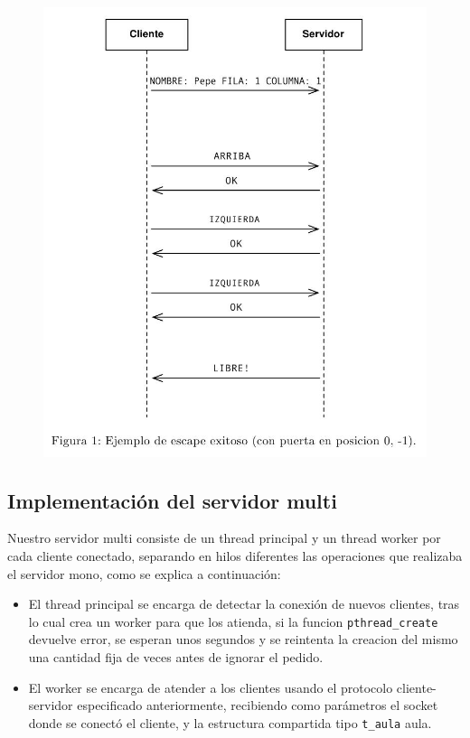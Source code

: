 \begin{figure}[H]
\centering
\includegraphics[scale=0.6]{img/prot.jpeg}
\end{figure}

\subsection{Implementaci\'on del servidor multi}

Nuestro servidor multi consiste de un thread principal y un thread worker por cada cliente conectado, separando en hilos diferentes las operaciones que realizaba el servidor mono, como se explica a continuaci\'on:

\begin{itemize}
\item El thread principal se encarga de detectar la conexi\'on de nuevos clientes, tras lo cual crea un worker para que los atienda, si la funcion \verb|pthread_create| devuelve error, se esperan unos segundos y se reintenta la creacion del mismo una cantidad fija de veces antes de ignorar el pedido.
\item El worker se encarga de atender a los clientes usando el protocolo cliente-servidor especificado anteriormente, recibiendo como par\'ametros el socket donde se conect\'o el cliente, y la estructura compartida tipo \verb|t_aula| aula.
\end{itemize}

